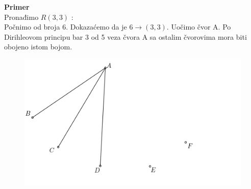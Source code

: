 \documentclass[12pt,a4paper]{article}
\begin{document}
	
	\vspace{1em}
	{\noindent\fontsize{12pt}{12pt}\textbf{Primer}}
	\vspace{0.5em}
	\\	
	Pronađimo $R(3,3)$ :
	\\Počnimo od broja 6. Dokazaćemo da je $6 \rightarrow (3, 3)$. Uočimo čvor A. Po Dirihleovom principu bar 3 od 5 veza čvora A sa ostalim čvorovima mora biti obojeno istom bojom. 
	\begin{figure}[h]
	\centering
	\includegraphics[scale=2.3]{r33.png}
	\end{figure}
	
\end{document}
